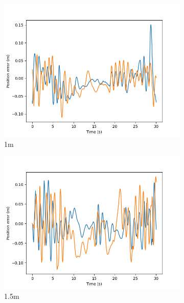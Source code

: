 \documentclass[class=article, crop=false]{standalone}
\begin{document}
\begin{figure}
\begin{subfigure}[b]{0.48\textwidth}
        \label{}
    \end{subfigure}
    \vfill
    \begin{subfigure}[b]{0.48\textwidth}
        \centering
        \includegraphics{scenario1/rov-0m/1.0m/rov_position_error_controlled}
        \caption{1m}
        \label{}
    \end{subfigure}
    \hfill
    \begin{subfigure}[b]{0.48\textwidth}
        \centering
        \includegraphics{scenario1/rov-0m/1.5m/rov_position_error_controlled}
        \caption{1.5m}
        \label{}
    \end{subfigure}
    \vfill
    \begin{subfigure}[b]{0.48\textwidth}

\end{subfigure}
\end{figure}
\end{document}
